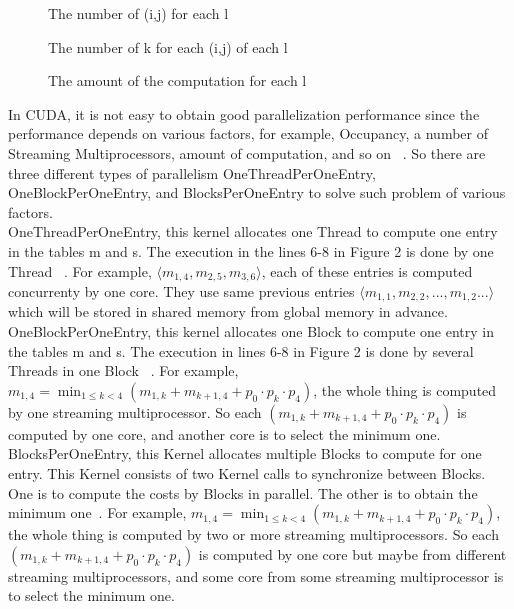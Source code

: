 \documentclass[11pt]{article}
\begin{document}
\begin{figure}[H]
\centering
\begin{minipage}{.3\textwidth}
  \centering
	\fbox{\texttt{[image: dp5]} } 
	\label{fig:dp5}
	\caption{The number of (i,j) for each l ~\cite{DP}}
\end{minipage}%
\begin{minipage}{.3\textwidth}
  \centering
	\fbox{\texttt{[image: dp6]} } 
	\label{fig:dp6}
	\caption{The number of k for each (i,j) of each l ~\cite{DP}}
\end{minipage}%
\begin{minipage}{.3\textwidth}
  \centering
	\fbox{\texttt{[image: dp7]} } 
	\label{fig:dp7}
	\caption{The amount of the computation for each l ~\cite{DP}}
\end{minipage}%
\end{figure}

In CUDA, it is not easy to obtain good parallelization performance since the performance depends on various factors, for example, Occupancy, a number of Streaming Multiprocessors, amount of computation, and so on ~\cite{DP}. So there are three different types of parallelism OneThreadPerOneEntry, OneBlockPerOneEntry, and BlocksPerOneEntry to solve such problem of various factors.\\

OneThreadPerOneEntry, this kernel allocates one Thread to compute one entry in the tables m and s. The execution in the lines 6-8 in Figure 2 is done by one Thread ~\cite{DP}. For example, $\langle m_{1,4},m_{2,5},m_{3,6} \rangle$, each of these entries is computed concurrenty by one core. They use same previous entries $\langle m_{1,1},m_{2,2},...,m_{1,2}... \rangle$ which will be stored in shared memory from global memory in advance. \\

OneBlockPerOneEntry, this kernel allocates one Block to compute one entry in the tables m and s. The execution in lines 6-8 in Figure 2 is done by several Threads in one Block ~\cite{DP}. For example, $m_{1,4}= \min_{1 \leq k < 4}(m_{1,k}+m_{k+1,4}+p_{0} \cdot p_k \cdot p_4)$, the whole thing is computed by one streaming multiprocessor. So each $(m_{1,k}+m_{k+1,4}+p_{0} \cdot p_k \cdot p_4)$ is computed by one core, and another core is to select the minimum one. \\

BlocksPerOneEntry, this Kernel allocates multiple Blocks to compute for one entry. This Kernel consists of two Kernel calls to synchronize between Blocks. One is to compute the costs by Blocks in parallel. The other is to obtain the minimum one~\cite{DP}. For example, $m_{1,4}= \min_{1 \leq k < 4}(m_{1,k}+m_{k+1,4}+p_{0} \cdot p_k \cdot p_4)$, the whole thing is computed by two or more streaming multiprocessors. So each $(m_{1,k}+m_{k+1,4}+p_{0} \cdot p_k \cdot p_4)$ is computed by one core but maybe from different streaming multiprocessors, and some core from some streaming multiprocessor is to select the minimum one.\\
\end{document}
